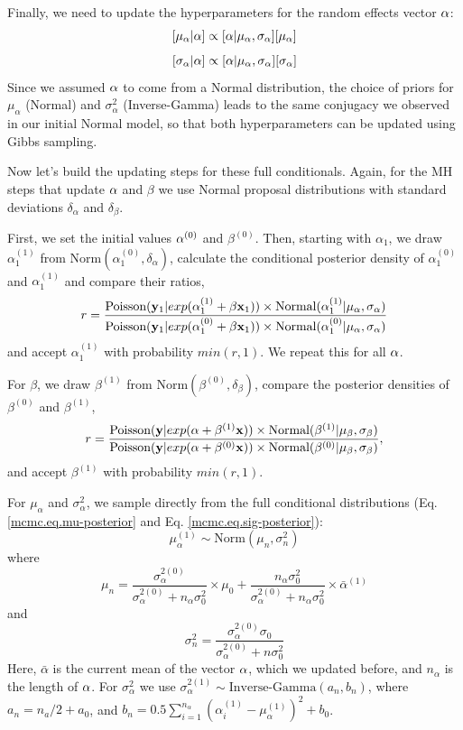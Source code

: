 Finally, we need to update the hyperparameters for the random effects
vector ${\bf \alpha}$:
\[
[\mu_{\alpha}|{\bf \alpha}] \propto [{\bf \alpha}|\mu_{\alpha}, \sigma_{\alpha}] [\mu_{\alpha}]
\]
\[
[\sigma_{\alpha}|{\bf\alpha}] \propto [{\bf \alpha}|\mu_{\alpha}, \sigma_{\alpha}] [\sigma_{\alpha}]
\]
Since we assumed ${\bf \alpha}$ to come from a Normal distribution,
the choice of priors for $\mu_{\alpha}$ (Normal) and $\sigma_{\alpha}^2$
(Inverse-Gamma) leads to the same conjugacy we observed in our initial
Normal model, so that both hyperparameters can be updated using Gibbs
sampling.

Now let's build the updating steps for these full conditionals. Again,
for the MH steps that update ${\bf \alpha}$ and $\beta$ we use Normal
proposal distributions with standard deviations $\delta_{\alpha}$ and
$\delta_{\beta}$.

First, we set the initial values ${\bf \alpha}^{(0)}$ and
$\beta^{(0)}$. Then, starting with $\alpha_1$, we draw
$\alpha_1^{(1)}$ from $\mbox{Norm}(\alpha_1^{(0)}, \delta_{\alpha})$,
calculate the conditional posterior density of $\alpha_1^{(0)}$ and
$\alpha_1^{(1)}$ and compare their ratios,
\[
r = \frac{\mbox{Poisson}({\bf y}_{1}|exp(\alpha_1^{(1)} + \beta {\bf x}_1)) \times
  \mbox{Normal}(\alpha_1^{(1)}|\mu_{\alpha}, \sigma_{\alpha})} {\mbox{Poisson}({\bf y}_{1}|exp(\alpha_1^{(0)} + \beta {\bf x}_1)) \times \mbox{Normal}(\alpha_1^{(0)}|\mu_{\alpha}, \sigma_{\alpha})}
\]
and accept $\alpha_1^{(1)}$ with probability $min(r,1)$. We repeat this for all ${\bf \alpha}$.

For $\beta$, we draw $\beta^{(1)}$ from $\mbox{Norm} (\beta^{(0)}, \delta_{\beta})$, compare the posterior densities of $\beta^{(0)}$ and $\beta^{(1)}$,
\[
r = \frac{\mbox{Poisson}({\bf y}|exp({\bf \alpha} + \beta^{(1)}{\bf x}))
  \times\mbox{Normal}(\beta^{(1)}|\mu_{\beta}, \sigma_{\beta})} { \mbox{Poisson}({\bf
    y}|exp({\bf \alpha} + \beta^{(0)}{\bf x})) \times \mbox{Normal}(\beta^{(0)}|\mu_{\beta}, \sigma_{\beta})},
\]
and accept $\beta^{(1)}$  with probability $min(r,1)$.

For $\mu_{\alpha}$ and $\sigma_{\alpha}^2$, we sample directly from the full conditional distributions (Eq. \ref{mcmc.eq.mu-posterior}  and Eq. \ref{mcmc.eq.sig-posterior}):
\[
\mu_{\alpha}^{(1)} \sim \mbox{Norm} (\mu_n, \sigma_n^2)
\]
where
\[\mu_n =  \frac{\sigma_{\alpha}^{2(0)}}  {\sigma_{\alpha}^{2(0)}   +n_{\alpha}    \sigma_0^2} \times  \mu_0 +  \frac{n_{\alpha}  \sigma_0^2} {\sigma_{\alpha}^{2(0)}   +n_{\alpha} \sigma_0^2} \times \bar{\alpha}^{(1)}
\]
and
\[
\sigma_n^2= \frac{\sigma_{\alpha}^{2(0)}   \sigma_0 } {\sigma_{\alpha}^{2(0)}  + n \sigma_0^2}
\]
Here, $\bar{\alpha}$ is the current mean of the vector ${\bf\alpha}$, which we
updated before, and $n_{\alpha}$ is the length of ${\bf\alpha}$.
For $\sigma_{\alpha}^2$ we use $\sigma_{\alpha}^{2(1)}\sim \mbox{Inverse-Gamma} (a_n, b_n)$,
where  $a_n = n_a/2   + a_0$, and $b_n = 0.5  \displaystyle\sum\limits_{i=1}^{n_{\alpha}} (\alpha_i^{(1)}-\mu_{\alpha}^{(1)})^2+ b_0$.



